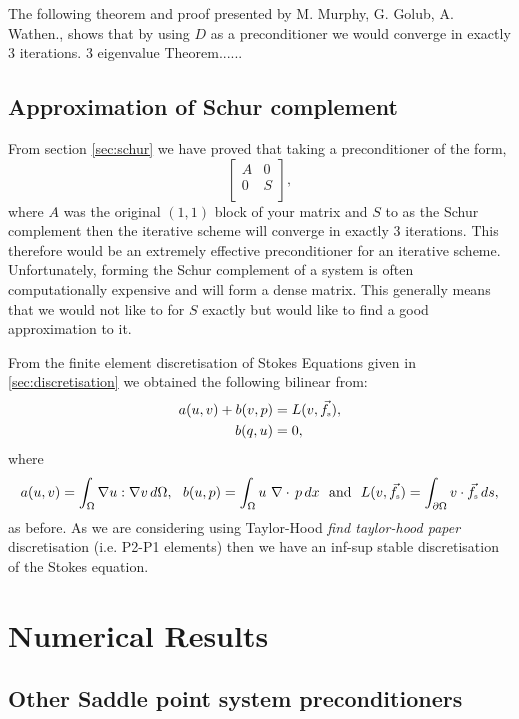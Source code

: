\documentclass[11pt]{article}
\numberwithin{equation}{section}    %
\newcommand{\s}{\vec{s}}
\renewcommand{\div}{\nabla\cdot\,}
\newcommand{\grad}{\ensuremath{\nabla}}
\renewcommand{\s}{Stokes Equations }
\newcommand{\Fs}{\vec{f}_{\mbox{\tiny s}}}
\begin{document}
The following theorem and proof presented by M. Murphy, G. Golub, A. Wathen., shows that by using $D$ as a preconditioner we would converge in exactly 3 iterations.
3 eigenvalue Theorem......

\subsection{Approximation of Schur complement} \label{sec:schurapprox}

From section \ref{sec:schur} we have proved that taking a preconditioner of the form,
$$\begin{bmatrix}
A & 0\\
0 & S\\
\end{bmatrix}, $$
where $A$ was the original $(1,1)$ block of your matrix and $S$ to as the Schur complement then the iterative scheme will converge in exactly $3$ iterations. This therefore would be an extremely effective preconditioner for an iterative scheme. Unfortunately, forming the Schur complement of a system is often computationally expensive and will form a dense matrix. This generally means that we would not like to for $S$ exactly but would like to find a good approximation to it.

From the finite element discretisation of \s given in \ref{sec:discretisation} we obtained the following bilinear from:
\begin{equation} \label{eq:bilinForm}
    \begin{aligned}
        a(u,v)+ b(v,p) &= L(v,\Fs),\\
        b(q,u)     &= 0,
    \end{aligned}
\end{equation}
where $$a(u,v) = \int_\Omega \grad u : \grad v \, d\Omega, \ \ b(u,p) = \int_\Omega u\ \div p \, dx \ \  \mbox{and} \ \  L(v,\Fs) = \int_{\partial \Omega} v\cdot \Fs \, ds, $$
as before. As we are considering using Taylor-Hood \emph{find taylor-hood paper} discretisation (i.e. P2-P1 elements) then we have an inf-sup stable discretisation of the Stokes equation.


\section{Numerical Results} \label{sec:results}



\subsection{Other Saddle point system preconditioners}
\end{document}
